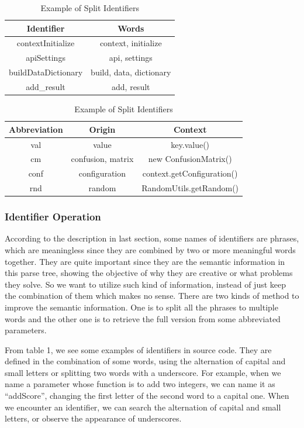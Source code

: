 \begin{table}[!htp]\label{table:splitID}
\centering
\begin{tabular}{|c|c|}
\hline
Identifier & Words \\
\hline
contextInitialize & context, initialize\\
\hline
apiSettings & api, settings\\
\hline
buildDataDictionary & build, data, dictionary\\
\hline
add\_result & add, result\\
\hline
\end{tabular}
\caption{Example of Split Identifiers}
\end{table}

\begin{table}[!htp]\label{table:abbr}
\centering
\begin{tabular}{|c|c|c|}
\hline
Abbreviation & Origin & Context\\
\hline
val & value & key.value()\\
\hline
cm & confusion, matrix & new ConfusionMatrix()\\
\hline
conf & configuration & context.getConfiguration()\\
\hline
rnd & random & RandomUtils.getRandom()\\
\hline
\end{tabular}
\caption{Example of Split Identifiers}
\end{table}

\subsubsection{Identifier Operation}
According to the description in last section, some names of identifiers are phrases, which are meaningless since they are combined by
two or more meaningful words together. They are quite important since they are the semantic information in this parse tree, showing the objective of why
they are creative or what problems they solve. So we want to utilize such kind of information, instead of just keep the combination of them which makes no
sense. There are two kinds of method to improve the semantic information. One is to split all the phrases to multiple words and the other one is to retrieve the
full version from some abbreviated parameters.

From table 1, we see some examples of identifiers in source code. They are defined in the combination of some words, using the alternation of capital and small
letters or splitting two words with a underscore. For example, when we name a parameter whose function is to add two integers, we can name it as ``addScore'',
changing the first letter of the second word to a capital one. When we encounter an identifier, we can search the alternation of capital and small letters, or
observe the appearance of underscores.


